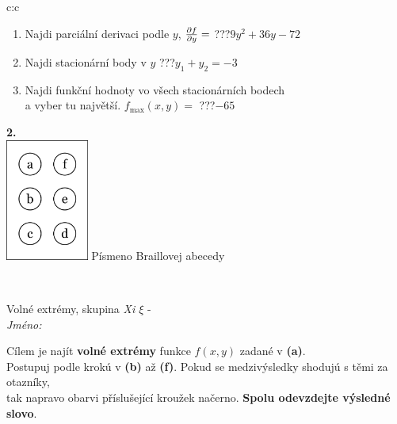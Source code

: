 \documentclass[10pt]{report}
\begin{document}
\begin{tabular}{c:c}
\begin{minipage}[c][104.5mm][t]{0.5\linewidth}
\begin{center}
\begin{minipage}{0.79\linewidth}
\begin{center}
\begin{varwidth}{\linewidth}
\begin{enumerate}
\item Najdi parciální derivaci podle $y$, $\pdv{f}{y}=$\quad \dotfill\; ???\;\dotfill \quad $9y^2+36y-72$
\item Najdi stacionární body v $y$\quad \dotfill\; ???\;\dotfill \quad $y_1+y_2=-3$
\item Najdi funkční hodnoty vo všech stacionárních bodech \\ \phantom{xxxxxx} a vyber tu najvětší. $f_{\text{max}}(x,y)=$\quad \dotfill\; ???\;\dotfill \quad $-65$
\end{enumerate}
\end{varwidth}
\end{center}
\end{minipage}
\begin{minipage}{0.20\linewidth}
\begin{center}
{\Huge\bfseries 2.} \\[2mm]
\includegraphics[height=40mm]{../images/braille.png}
{\small Písmeno Braillovej abecedy}
\end{center}
\end{minipage}
\end{center}
\end{minipage}
\\ \hdashline
\begin{minipage}[c][104.5mm][t]{0.5\linewidth}
\begin{center}
\vspace{7mm}
{\huge Volné extrémy, skupina \textit{Xi $\xi$} -}\\[5mm]
\textit{Jméno:}\phantom{xxxxxxxxxxxxxxxxxxxxxxxxxxxxxxxxxxxxxxxxxxxxxxxxxxxxxxxxxxxxxxxxx}\\[5mm]
\begin{minipage}{0.95\linewidth}
\begin{center}
Cílem je najít \textbf{volné extrémy} funkce $f(x,y)$ zadané v \textbf{(a)}.\\Postupuj podle krokú v \textbf{(b)} až \textbf{(f)}. Pokud se medzivýsledky shodujú s těmi za otazníky,\\tak napravo obarvi příslušející kroužek načerno. \textbf{Spolu odevzdejte výsledné slovo}.

\end{center}
\end{minipage}
\end{center}
\end{minipage}
\end{tabular}
\end{document}
